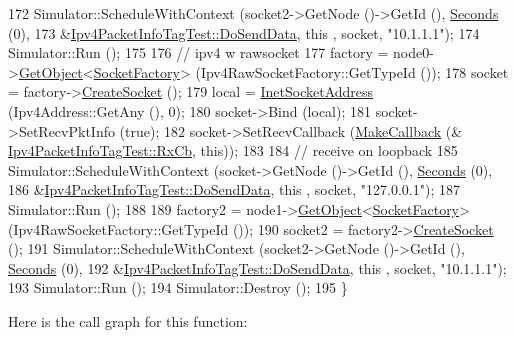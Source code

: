 \begin{DoxyCode}
172   Simulator::ScheduleWithContext (socket2->GetNode ()->GetId (), \hyperlink{group__timecivil_ga33c34b816f8ff6628e33d5c8e9713b9e}{Seconds} (0),
173                                   &\hyperlink{classIpv4PacketInfoTagTest_a5cba94d15d8c0921a95a3769c06221b7}{Ipv4PacketInfoTagTest::DoSendData}, \textcolor{keyword}{this}
      , socket, \textcolor{stringliteral}{"10.1.1.1"});
174   Simulator::Run ();
175 
176   \textcolor{comment}{// ipv4 w rawsocket}
177   factory = node0->\hyperlink{classns3_1_1Object_a13e18c00017096c8381eb651d5bd0783}{GetObject}<\hyperlink{classns3_1_1SocketFactory}{SocketFactory}> (Ipv4RawSocketFactory::GetTypeId ());
178   socket = factory->\hyperlink{classns3_1_1SocketFactory_a97351e6e7860503a4912042530449f62}{CreateSocket} ();
179   local =  \hyperlink{classns3_1_1InetSocketAddress}{InetSocketAddress} (Ipv4Address::GetAny (), 0);
180   socket->Bind (local);
181   socket->SetRecvPktInfo (\textcolor{keyword}{true});
182   socket->SetRecvCallback (\hyperlink{group__makecallbackmemptr_ga9376283685aa99d204048d6a4b7610a4}{MakeCallback} (&
      \hyperlink{classIpv4PacketInfoTagTest_ac528deb0c346c973c2e5391540a53bc3}{Ipv4PacketInfoTagTest::RxCb}, \textcolor{keyword}{this}));
183 
184   \textcolor{comment}{// receive on loopback}
185   Simulator::ScheduleWithContext (socket->GetNode ()->GetId (), \hyperlink{group__timecivil_ga33c34b816f8ff6628e33d5c8e9713b9e}{Seconds} (0),
186                                   &\hyperlink{classIpv4PacketInfoTagTest_a5cba94d15d8c0921a95a3769c06221b7}{Ipv4PacketInfoTagTest::DoSendData}, \textcolor{keyword}{this}
      , socket, \textcolor{stringliteral}{"127.0.0.1"});
187   Simulator::Run ();
188 
189   factory2 = node1->\hyperlink{classns3_1_1Object_a13e18c00017096c8381eb651d5bd0783}{GetObject}<\hyperlink{classns3_1_1SocketFactory}{SocketFactory}> (Ipv4RawSocketFactory::GetTypeId ());
190   socket2 = factory2->\hyperlink{classns3_1_1SocketFactory_a97351e6e7860503a4912042530449f62}{CreateSocket} ();
191   Simulator::ScheduleWithContext (socket2->GetNode ()->GetId (), \hyperlink{group__timecivil_ga33c34b816f8ff6628e33d5c8e9713b9e}{Seconds} (0),
192                                   &\hyperlink{classIpv4PacketInfoTagTest_a5cba94d15d8c0921a95a3769c06221b7}{Ipv4PacketInfoTagTest::DoSendData}, \textcolor{keyword}{this}
      , socket, \textcolor{stringliteral}{"10.1.1.1"});
193   Simulator::Run ();
194   Simulator::Destroy ();
195 \}
\end{DoxyCode}


Here is the call graph for this function\+:


